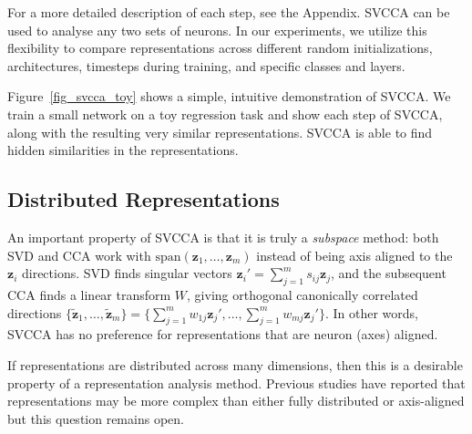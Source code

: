 \documentclass{article} %
\begin{document}
For a more detailed description of each step, see the Appendix.
SVCCA can be used to analyse any two sets of neurons. In our experiments, we utilize this flexibility to compare representations across different random initializations, architectures, timesteps during training, and specific classes and layers.


Figure~\ref{fig_svcca_toy} shows a simple, intuitive demonstration of
SVCCA. We train a small network on a toy regression task and show each
step of SVCCA, along with the resulting very similar representations.
SVCCA is able to find hidden similarities in the representations.


\subsection{Distributed Representations}
\label{sec:distrib_rep}

An important property of SVCCA is that it is truly a \textit{subspace} method: both SVD and CCA work with $\mathrm{span}( \pmb{z}_1, \ldots, \pmb{z}_m )$ instead of being axis aligned to the $\pmb{z}_i$ directions. SVD finds singular vectors  $\pmb{z}_i' = \sum_{j=1}^m s_{ij}\pmb{z}_j$, and the subsequent CCA finds a linear transform $W$, giving orthogonal canonically correlated directions $\{ \tilde{\pmb{z}}_1, \ldots, \tilde{\pmb{z}}_m \} = \{ \sum_{j=1}^m w_{1j} \pmb{z}_j', \ldots, \sum_{j=1}^m w_{mj} \pmb{z}_j' \}$. In other words, SVCCA has no preference for representations that are neuron (axes) aligned.

If representations are distributed across many dimensions, then
this is a desirable property of a representation analysis method.
Previous studies have reported that representations may be more complex than either
fully distributed or axis-aligned \cite{szegedy2013intriguing,zhou-2014-arXiv-object-detectors-emerge,li-2016-arXivICLR-convergent-learning:-do-different} but this question remains open.
\end{document}
